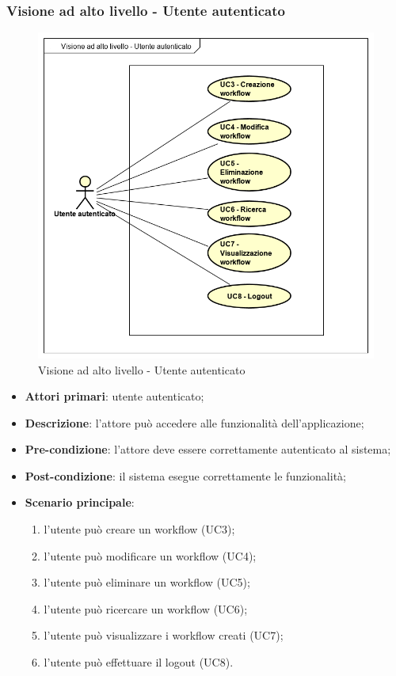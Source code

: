 \subsubsection{Visione ad alto livello - Utente autenticato}
\begin{figure}[H]
\centering
\includegraphics[scale=0.7]{immagini/UC0-2.png}
\caption{Visione ad alto livello - Utente autenticato \label{fig:uc0-2}}
\end{figure}

\begin{itemize}
\item \textbf{Attori primari}: utente autenticato;

\item \textbf{Descrizione}: l'attore può accedere alle funzionalità dell'applicazione;

\item \textbf{Pre-condizione}: l'attore deve essere correttamente autenticato al sistema;

\item \textbf{Post-condizione}: il sistema esegue correttamente le funzionalità;

\item \textbf{Scenario principale}:
\begin{enumerate}
\item l'utente può creare un workflow (UC3);
\item l'utente può modificare un workflow (UC4);
\item l'utente può eliminare un workflow (UC5);
\item l'utente può ricercare un workflow (UC6);
\item l'utente può visualizzare i workflow creati (UC7);
\item l'utente può effettuare il logout (UC8).

\end{enumerate}

\end{itemize}

